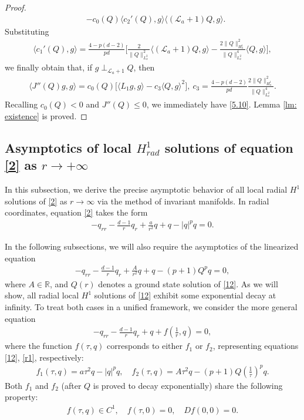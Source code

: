 \documentclass[12pt]{amsart}
\newcommand{\R}{\mathbb R}
\newcommand{\la}{\mathcal L_a}
\begin{document}
\begin{proof}
\begin{equation}
\begin{split}
 &-c_0( Q) \langle c_2'( Q), g\rangle \langle (\la+1) Q,g\rangle. 
 \end{split} \end{equation}
Substituting 
 \begin{align}\label{5.8}
\langle c_1'( Q), g \rangle=\tfrac{4-p(d-2)}{pd}\biggl[\tfrac 2{\| Q\|_{L_x^2}^2}\langle (\la+1) Q,g\rangle -\tfrac{2\| Q\|_{H^1_a}^2}{\| Q\|_{L_x^2}^4}\langle  Q,g\rangle\biggr],
 \end{align}
 we finally obtain that, if $g\perp_{\la+1} Q$, then 
 \begin{align}
 \langle J''( Q)g, g\rangle =c_0( Q)\bigl[ \langle L_1 g, g\rangle -c_3\langle  Q, g\rangle^2\bigr], \ c_3=\tfrac{4-p(d-2)}{pd}\tfrac{2\| Q\|_{H^1_a}^2}{\| Q\|_{L_x^2}^4}.
 \end{align}
 Recalling $c_0( Q)<0$ and $J''(Q)\le 0$, we immediately have \eqref{5.10}. 
  Lemma \ref{lm: existence} is proved. 
 \end{proof}

 
 
 \subsection{Asymptotics of local $H^1_{rad}$ solutions of equation \eqref{2} as $r\to +\infty$}\label{S:22}

In this subsection, we derive the precise asymptotic behavior of all local radial $H^1$ solutions of \eqref{2} as $r\to \infty$ via the method of invariant manifolds. In radial coordinates, equation \eqref{2} takes the form 
\begin{align}\label{12}
-q_{rr}-\tfrac{d-1}r q_r+\tfrac a{r^2} q+q-|q|^{p} q=0. 
\end{align}

In the following subsections, we will also require the asymptotics of  the linearized equation 
\begin{align}\label{r1}
-q_{rr}-\tfrac{d-1}r q_r+\tfrac A{r^2}q+q-(p+1)Q^p q=0,
\end{align}
where $A\in \R$, and $Q(r)$ denotes a ground state solution of \eqref{12}. As we will show, all radial local $H^1$ solutions of \eqref{12} exhibit some exponential decay at infinity. To treat both cases in a unified framework, we consider the more general equation
\begin{align}\label{r2}
-q_{rr}-\tfrac{d-1}r q_r+q+f(\tfrac 1r, q)=0,
\end{align}
 where the function $f(\tau, q)$ corresponds to either $f_1$ or $f_2$, representing equations \eqref{12}, \eqref{r1}, respectively:
\begin{align} \label{f12}
f_1(\tau, q)=a\tau^2 q-|q|^{p} q, \quad f_2(\tau, q)=A\tau^2 q-(p+1)Q(\tfrac 1\tau)^p q.
\end{align}
Both $f_1$ and $f_2$ (after $Q$ is proved to decay exponentially) share the following property:
\begin{align}\label{r3}
f(\tau, q)\in C^1, \quad f(\tau, 0)=0, \quad Df(0, 0)=0.
\end{align}
\end{document}
